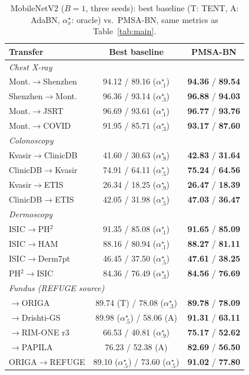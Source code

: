 \documentclass{article}
\newcommand{\B}[1]{\textbf{#1}}
\begin{document}
\begin{table}[!htb]
\centering
\caption{MobileNetV2 ($B{=}1$, three seeds): best baseline (T: TENT, A: AdaBN, $\alpha^\star_{x}$: oracle) vs.\ PMSA-BN, same metrics as Table~\ref{tab:main}.}
\label{tab:mbv2}
\footnotesize
\setlength{\tabcolsep}{3pt}
\begin{tabular}{lcc}
\toprule
Transfer & Best baseline & PMSA-BN\\
\midrule
\multicolumn{3}{l}{\emph{Chest X-ray}}\\
 Mont.$\to$Shenzhen & 94.12 / 89.16 ($\alpha^\star_{.1}$) & \B{94.36} / \B{89.54} \\
 Shenzhen$\to$Mont. & 96.36 / 93.14 ($\alpha^\star_{.3}$) & \B{96.88} / \B{94.03} \\
 Mont.$\to$JSRT & 96.69 / 93.61 ($\alpha^\star_{.1}$) & \B{96.77} / \B{93.76} \\
 Mont.$\to$COVID & 91.95 / 85.71 ($\alpha^\star_{.3}$) & \B{93.17} / \B{87.60} \\
\midrule
\multicolumn{3}{l}{\emph{Colonoscopy}}\\
 Kvasir$\to$ClinicDB & 41.60 / 30.63 ($\alpha^\star_{.9}$) & \B{42.83} / \B{31.64} \\
 ClinicDB$\to$Kvasir & 74.91 / 64.11 ($\alpha^\star_{.5}$) & \B{75.24} / \B{64.56} \\
 Kvasir$\to$ETIS & 26.34 / 18.25 ($\alpha^\star_{.9}$) & \B{26.47} / \B{18.39} \\
 ClinicDB$\to$ETIS & 42.05 / 31.98 ($\alpha^\star_{.5}$) & \B{47.03} / \B{36.47} \\
\midrule
\multicolumn{3}{l}{\emph{Dermoscopy}}\\
 ISIC$\to$PH$^2$ & 91.35 / 85.08 ($\alpha^\star_{.1}$) & \B{91.65} / \B{85.09} \\
 ISIC$\to$HAM & 88.16 / 80.94 ($\alpha^\star_{.1}$) & \B{88.27} / \B{81.11} \\
 ISIC$\to$Derm7pt & 46.45 / 37.50 ($\alpha^\star_{.5}$) & \B{47.61} / \B{38.25} \\
 PH$^2$$\to$ISIC & 84.36 / 76.49 ($\alpha^\star_{.3}$) & \B{84.56} / \B{76.69} \\
\midrule
\multicolumn{3}{l}{\emph{Fundus (REFUGE source)}}\\
 $\to$ORIGA      & 89.74 (T) / 78.08 ($\alpha^\star_{.3}$) & \B{89.78} / \B{78.09} \\
 $\to$Drishti-GS & 89.98 ($\alpha^\star_{.5}$) / 58.06 (A) & \B{91.31} / \B{63.11} \\
 $\to$RIM-ONE r3 & 66.53 / 40.81 ($\alpha^\star_{.9}$)     & \B{75.17} / \B{52.62} \\
 $\to$PAPILA     & 76.23 / 52.38 (A)                        & \B{82.69} / \B{56.50} \\
 ORIGA$\to$REFUGE& 89.10 ($\alpha^\star_{.5}$) / 73.60 ($\alpha^\star_{.5}$) & \B{91.02} / \B{77.80} \\
\bottomrule
\end{tabular}
\end{table}
\end{document}
